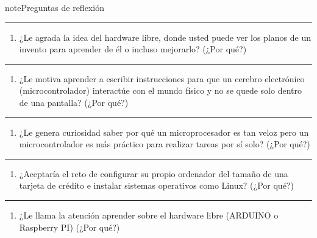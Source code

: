 \documentclass[letterpaper,10pt,spanish]{sphinxmanual}
\begin{document}
\begin{sphinxadmonition}{note}{Preguntas de reflexión}
\begin{enumerate}
\end{enumerate}


\bigskip\hrule\bigskip

\begin{enumerate}
%
\setcounter{enumi}{5}
\item {} 
\sphinxAtStartPar
¿Le agrada la idea del hardware libre, donde usted puede ver los planos de un invento para aprender de él o incluso mejorarlo? (¿Por qué?)

\end{enumerate}


\bigskip\hrule\bigskip

\begin{enumerate}
%
\setcounter{enumi}{6}
\item {} 
\sphinxAtStartPar
¿Le motiva aprender a escribir instrucciones para que un cerebro electrónico (micro\sphinxhyphen{}controlador) interactúe con el mundo físico y no se quede solo dentro de una pantalla? (¿Por qué?)

\end{enumerate}


\bigskip\hrule\bigskip

\begin{enumerate}
%
\setcounter{enumi}{7}
\item {} 
\sphinxAtStartPar
¿Le genera curiosidad saber por qué un micro\sphinxhyphen{}procesador es tan veloz pero un micro\sphinxhyphen{}controlador es más práctico para realizar tareas por sí solo? (¿Por qué?)

\end{enumerate}


\bigskip\hrule\bigskip

\begin{enumerate}
%
\setcounter{enumi}{8}
\item {} 
\sphinxAtStartPar
¿Aceptaría el reto de configurar su propio ordenador del tamaño de una tarjeta de crédito e instalar sistemas operativos como Linux? (¿Por qué?)

\end{enumerate}


\bigskip\hrule\bigskip

\begin{enumerate}
%
\setcounter{enumi}{9}
\item {} 
\sphinxAtStartPar
¿Le llama la atención aprender sobre el hardware libre (ARDUINO o Raspberry PI) (¿Por qué?)

\end{enumerate}
\end{sphinxadmonition}
\end{document}
